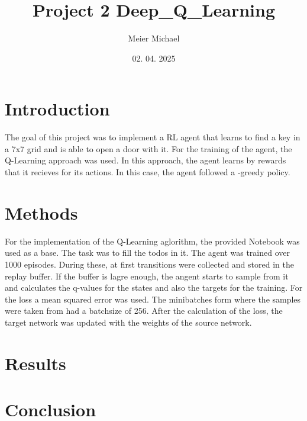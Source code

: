 \documentclass[a4paper, 9pt]{extarticle}
\title{Project 2  Deep_Q_Learning}
\author{Meier Michael}
\date{02. 04. 2025}
\begin{document}
\maketitle

\section*{Introduction}
The goal of this project was to implement a RL agent that learns to find a key in a 7x7 grid and is able to open a door with it.
For the training of the agent, the Q-Learning approach was used. In this approach, the agent learns by rewards 
that it recieves for its actions. In this case, the agent followed a \epsilon-greedy policy. 


\section*{Methods}
For the implementation of the Q-Learning aglorithm, the provided Notebook was used as a base. The task was to fill the 
todos in it. 
The agent was trained over 1000 episodes. During these, at first transitions were collected and stored in the replay buffer. 
If the buffer is lagre enough, the angent starts to sample from it and calculates the q-values for the states and also the targets for the training.
For the loss a mean squared error was used. The minibatches form where the samples were taken from had a batchsize of 256.
After the calculation of the loss, the target network was updated with the weights of the source network.


\section*{Results}



\section*{Conclusion}
\end{document}
